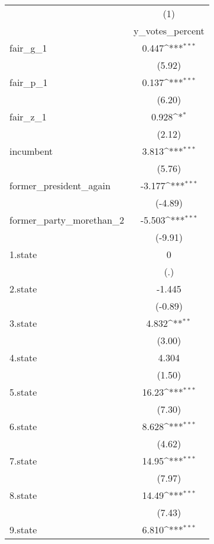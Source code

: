 {
\def\sym#1{\ifmmode^{#1}\else\(^{#1}\)\fi}
\begin{tabular}{l*{1}{c}}
\hline\hline
            &\multicolumn{1}{c}{(1)}\\
            &\multicolumn{1}{c}{y\_votes\_percent}\\
\hline
fair\_g\_1    &       0.447\sym{***}\\
            &      (5.92)         \\
[1em]
fair\_p\_1    &       0.137\sym{***}\\
            &      (6.20)         \\
[1em]
fair\_z\_1    &       0.928\sym{*}  \\
            &      (2.12)         \\
[1em]
incumbent   &       3.813\sym{***}\\
            &      (5.76)         \\
[1em]
former\_president\_again&      -3.177\sym{***}\\
            &     (-4.89)         \\
[1em]
former\_party\_morethan\_2&      -5.503\sym{***}\\
            &     (-9.91)         \\
[1em]
1.state     &           0         \\
            &         (.)         \\
[1em]
2.state     &      -1.445         \\
            &     (-0.89)         \\
[1em]
3.state     &       4.832\sym{**} \\
            &      (3.00)         \\
[1em]
4.state     &       4.304         \\
            &      (1.50)         \\
[1em]
5.state     &       16.23\sym{***}\\
            &      (7.30)         \\
[1em]
6.state     &       8.628\sym{***}\\
            &      (4.62)         \\
[1em]
7.state     &       14.95\sym{***}\\
            &      (7.97)         \\
[1em]
8.state     &       14.49\sym{***}\\
            &      (7.43)         \\
[1em]
9.state     &       6.810\sym{***}\\

\end{tabular}}
